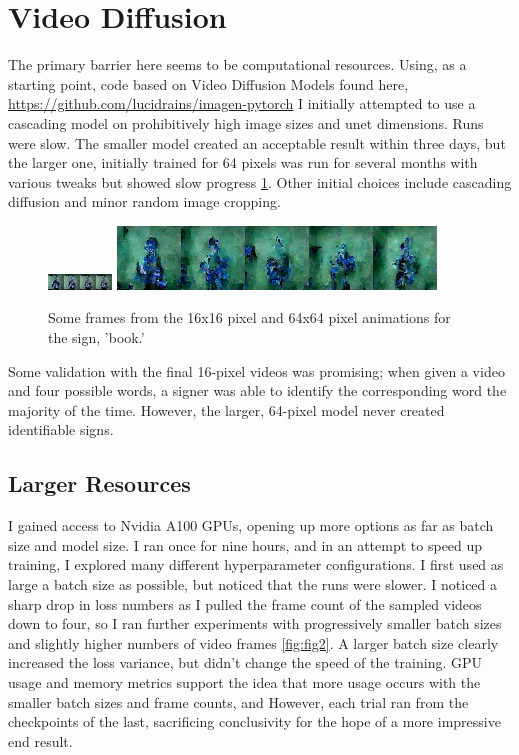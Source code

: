 \documentclass{article}
\begin{document}
\section{Video Diffusion}
The primary barrier here seems to be computational resources. Using, as a starting point, code based on Video Diffusion Models \cite{videodiffusion} found here,
\url{https://github.com/lucidrains/imagen-pytorch} I initially attempted to use a cascading model on prohibitively high image sizes and unet dimensions. Runs were slow. The smaller model created an acceptable result within three days, but the larger one, initially trained for 64 pixels was run for several months with various tweaks but showed slow progress \ref{fig:fig1}. Other initial choices include cascading diffusion and minor random image cropping. 
\begin{figure}
  \centering
  \includegraphics[scale=5]{book.png}
  \includegraphics[scale=1]{bigbook.png}
  \caption{Some frames from the 16x16 pixel and 64x64 pixel animations for the sign, 'book.'}
  \label{fig:fig1}
\end{figure}

Some validation with the final 16-pixel videos was promising; when given a video and four possible words, a signer was able to identify the corresponding word the majority of the time. However, the larger, 64-pixel model never created identifiable signs. 

\subsection{Larger Resources}
I gained access to Nvidia A100 GPUs, opening up more options as far as batch size and model size. I ran once for nine hours, and in an attempt to speed up training, I explored many different hyperparameter configurations. I first used as large a batch size as possible, but noticed that the runs were slower. I noticed a sharp drop in loss numbers as I pulled the frame count of the sampled videos down to four, so I ran further experiments with progressively smaller batch sizes and slightly higher numbers of video frames \ref{fig:fig2}. A larger batch size clearly increased the loss variance, but didn't change the speed of the training. GPU usage and memory metrics support the idea that more usage occurs with the smaller batch sizes and frame counts, and  However, each trial ran from the checkpoints of the last, sacrificing conclusivity for the hope of a more impressive end result. 
\end{document}
